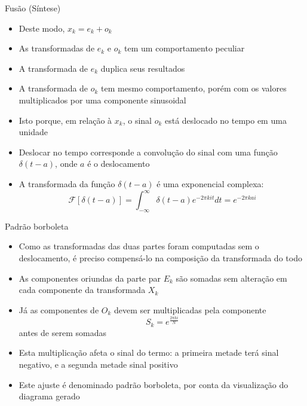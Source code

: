 \begin{frame}[fragile]{Fusão (Síntese)}

    \begin{itemize}
        \item Deste modo, $x_k = e_k + o_k$

        \item As transformadas de $e_k$ e $o_k$ tem um comportamento peculiar

        \item A transformada de $e_k$ duplica seus resultados

        \item A transformada de $o_k$ tem mesmo comportamento, porém com os valores multiplicados
            por uma componente sinusoidal

        \item Isto porque, em relação à $x_k$, o sinal $o_k$ está deslocado no tempo em uma
            unidade

        \item Deslocar no tempo corresponde a convolução do sinal com uma função $\delta(t - a)$,
            onde $a$ é o deslocamento

        \item A transformada da função $\delta(t - a)$ é uma exponencial complexa:
        \[
            \mathcal{F}[\delta(t - a)] = \int_{-\infty}^{\infty} \delta(t - a)e^{-2\pi kit}dt =
                e^{-2\pi kai}
        \]
    
    \end{itemize}

\end{frame}



\begin{frame}[fragile]{Padrão borboleta}

    \begin{itemize}
        \item Como as transformadas das duas partes foram computadas sem o deslocamento, é preciso
            compensá-lo na composição da transformada do todo

        \item As componentes oriundas da parte par $E_k$ são somadas sem alteração em cada
            componente da transformada $X_k$

        \item Já as componentes de $O_k$ devem ser multiplicadas pela componente 
        \[
            S_k = e^{\frac{2\pi ki}{N}}
        \]
        antes de serem somadas

        \item Esta multiplicação afeta o sinal do termo: a primeira metade terá sinal negativo, e
            a segunda metade sinal positivo

        \item Este ajuste é denominado padrão borboleta, por conta da visualização do diagrama
            gerado
    \end{itemize}

\end{frame}



